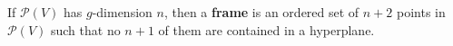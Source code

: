 If $\mathcal{P}(V)$ has $g$-dimension $n$, then a \textbf{frame} is an ordered set of $n+2$ points in $\mathcal{P}(V)$ such that no $n+1$ of them are contained in a hyperplane.
